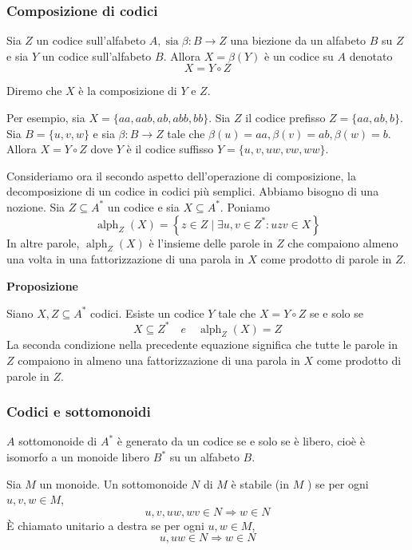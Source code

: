 \subsubsection{Composizione di codici}

Sia $Z$ un codice sull'alfabeto $A, \operatorname{sia} \beta: B \rightarrow Z$ una biezione da un alfabeto $B$ su $Z$ e sia $Y$ un codice sull'alfabeto $B$. Allora $X=\beta(Y)$ è un codice su $A$ denotato
$$
X=Y \circ Z
$$

Diremo che $X$ è la composizione di $Y$ e $Z$.

Per esempio, sia $X=\{a a, a a b, a b, a b b, b b\}$. Sia $Z$ il codice prefisso $Z=\{a a, a b, b\} .$ Sia $B=\{u, v, w\}$ e sia $\beta: B \rightarrow Z$ tale che $\beta(u)=a a, \beta(v)=a b, \beta(w)=b$. Allora $X=Y \circ Z$ dove $Y$ è il codice suffisso $Y=\{u, v, u w, v w, w w\}$.

\vspace{5mm}

Consideriamo ora il secondo aspetto dell'operazione di composizione, la decomposizione di un codice in codici più semplici.
Abbiamo bisogno di una nozione. Sia $Z \subseteq A^{*}$ un codice e sia $X \subseteq A^{*} .$ Poniamo
$$
\operatorname{alph}_{Z}(X)=\left\{z \in Z \mid \exists u, v \in Z^{*}: u z v \in X\right\}
$$
In altre parole, $\operatorname{alph}_{Z}(X)$ è l'insieme delle parole in $Z$ che compaiono almeno una volta in una fattorizzazione di una parola in $X$ come prodotto di parole in $Z$.

\vspace{5mm}

\textbf{Proposizione}

Siano $X, Z \subseteq A^{*}$ codici. Esiste un codice $Y$ tale che $X=Y \circ Z$ se e solo se
$$
X \subseteq Z^{*} \quad e \quad \operatorname{alph}_{Z}(X)=Z
$$
La seconda condizione nella precedente equazione significa che tutte le parole in $Z$ compaiono in almeno una fattorizzazione di una parola in $X$ come prodotto di parole in $Z$.

\subsubsection{Codici e sottomonoidi}

$A$ sottomonoide di $A^{*}$ è generato da un codice se e solo se è libero, cioè è isomorfo a un monoide libero $B^{*}$ su un alfabeto $B$.

Sia $M$ un monoide. Un sottomonoide $N$ di $M$ è stabile (in $M$ ) se per ogni $u, v, w \in M$,
$$
u, v, u w, w v \in N \Rightarrow w \in N
$$
È chiamato unitario a destra se per ogni $u, w \in M$,
$$
u, u w \in N \Rightarrow w \in N
$$

